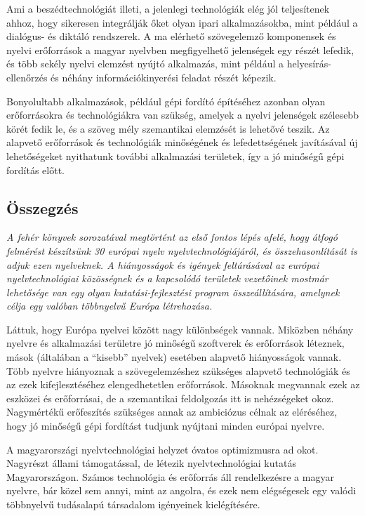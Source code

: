 \begin{multicols}{2}
  Ami a beszédtechnológiát illeti, a jelenlegi technológiák elég jól teljesítenek ahhoz, hogy sikeresen integrálják őket olyan ipari alkalmazásokba, mint például a dialógus- és diktáló rendszerek. A ma elérhető szövegelemző komponensek és nyelvi erőforrások a magyar nyelvben megfigyelhető jelenségek egy részét lefedik, és több sekély nyelvi elemzést nyújtó alkalmazás, mint például a helyesírás-ellenőrzés és néhány információkinyerési feladat részét képezik. 

  Bonyolultabb alkalmazások, például gépi fordító építéséhez azonban olyan erőforrásokra és technológiákra van szükség, amelyek a nyelvi jelenségek szélesebb körét fedik le, és a szöveg mély szemantikai elemzését is lehetővé teszik. Az alapvető erőforrások és technológiák minőségének és lefedettségének javításával új lehetőségeket nyithatunk további alkalmazási területek, így a jó minőségű gépi fordítás előtt.

  \subsection{Összegzés}

  \emph{A fehér könyvek sorozatával megtörtént az első fontos lépés afelé, hogy átfogó felmérést készítsünk 30 európai nyelv nyelvtechnológiájáról, és összehasonlítását is adjuk ezen nyelveknek. A hiányosságok és igények feltárásával az európai nyelvtechnológiai közösségnek és a kapcsolódó területek vezetőinek mostmár lehetősége van egy olyan kutatási-fejlesztési program összeállítására, amelynek célja egy valóban többnyelvű Európa létrehozása.}

  Láttuk, hogy Európa nyelvei között nagy különbségek vannak. Miközben néhány nyelvre és alkalmazási területre jó mi\-nő\-sé\-gű szoftverek és erőforrások léteznek, mások (általában a "`kisebb"' nyelvek) esetében alapvető hiányosságok vannak. Több nyelvre hiányoznak a szö\-veg\-elem\-zés\-hez szükséges alapvető technológiák és az ezek kifejlesztéséhez elengedhetetlen erőforrások. Másoknak megvannak ezek az eszközei és erőforrásai, de a szemantikai feldolgozás itt is nehézségeket okoz. Nagymértékű erőfeszítés szükséges annak az ambiciózus célnak az eléréséhez, hogy jó minőségű gépi fordítást tudjunk nyújtani minden európai nyelvre.

  A magyarországi nyelvtechnológiai helyzet óvatos optimizmusra ad okot. Nagyrészt állami támogatással, de létezik nyelvtechnológiai kutatás Magyarországon. Számos technológia és erőforrás áll rendelkezésre a magyar nyelvre, bár közel sem annyi, mint az angolra, és ezek nem elégségesek egy valódi többnyelvű tudásalapú társadalom igényeinek kielégítésére.


\end{multicols}
